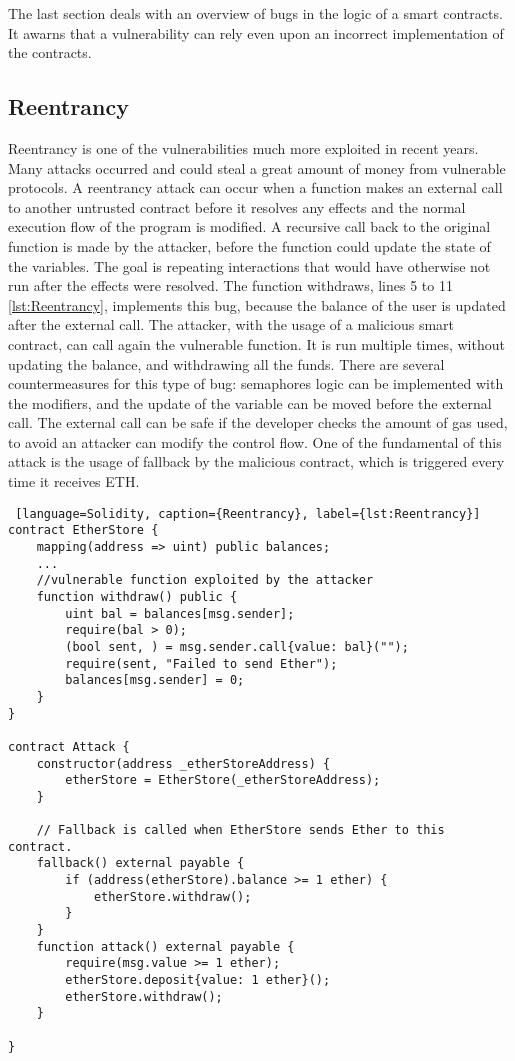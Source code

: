 \documentclass[a4paper,sigconf, language=french,
language=german, language=spanish, language=english]{acmart}
\begin{document}
The last section deals with an overview of bugs in the logic of a smart contracts. It awarns that a vulnerability can rely even upon an incorrect implementation of the contracts.

\subsection{Reentrancy} 
Reentrancy is one of the vulnerabilities much more exploited in recent years. 
Many attacks occurred and could steal a great amount of money from vulnerable protocols. 
A reentrancy attack can occur when a function makes an external call to another untrusted contract before it resolves any effects and the normal execution flow of the program is modified.
A recursive call back to the original function is made by the attacker, before 
the function could update the state of the variables. 
The goal is repeating interactions that would have otherwise not run after the effects were resolved. 
The function withdraws, lines 5 to 11 \autoref{lst:Reentrancy}, implements this bug, because the balance of the user is updated after the external call. 
The attacker, with the usage of a malicious smart contract, can call again the vulnerable function. 
It is run multiple times, without updating the balance, and withdrawing all the funds. There are several countermeasures for this type of bug: 
semaphores logic can be implemented with the modifiers, and the update of the variable can be moved before the external call. 
The external call can be safe if the developer checks the amount of gas used, to avoid an attacker can modify the control flow. 
One of the fundamental of this attack is the usage of fallback by the malicious contract, which is triggered every time it receives ETH.

\begin{lstlisting} [language=Solidity, caption={Reentrancy}, label={lst:Reentrancy}]
contract EtherStore {
    mapping(address => uint) public balances;
    ...
    //vulnerable function exploited by the attacker
    function withdraw() public {
        uint bal = balances[msg.sender];
        require(bal > 0);
        (bool sent, ) = msg.sender.call{value: bal}("");
        require(sent, "Failed to send Ether");
        balances[msg.sender] = 0;
    }
}

contract Attack {
    constructor(address _etherStoreAddress) {
        etherStore = EtherStore(_etherStoreAddress);
    }

    // Fallback is called when EtherStore sends Ether to this contract.
    fallback() external payable {
        if (address(etherStore).balance >= 1 ether) {
            etherStore.withdraw();
        }
    }
    function attack() external payable {
        require(msg.value >= 1 ether);
        etherStore.deposit{value: 1 ether}();
        etherStore.withdraw();
    }

}
  
\end{lstlisting}
\end{document}

